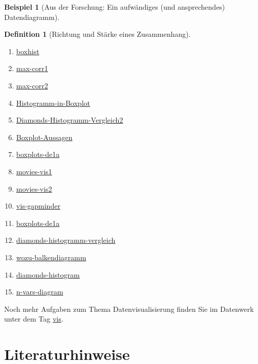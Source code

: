 \documentclass[
  a4paper,
]{scrbook}
\providecommand{\tightlist}{%
  \setlength{\itemsep}{0pt}\setlength{\parskip}{0pt}}\usepackage{longtable,booktabs,array}
\theoremstyle{definition}
\newtheorem{example}{Beispiel}[chapter]
\theoremstyle{definition}
\newtheorem{definition}{Definition}[chapter]
\theoremstyle{definition}
\theoremstyle{remark}
\begin{document}
\begin{example}[Aus der Forschung: Ein aufwändiges (und ansprechendes)
Datendiagramm]
\begin{definition}[Richtung und Stärke eines
Zusammenhang]
\begin{enumerate}
\def\labelenumi{\arabic{enumi}.}
\tightlist
\item
  \href{https://datenwerk.netlify.app/posts/boxhist/boxhist.html}{boxhist}
\item
  \href{https://datenwerk.netlify.app/posts/max-corr1/max-corr1.html}{max-corr1}
\item
  \href{https://datenwerk.netlify.app/posts/max-corr2/max-corr2.html}{max-corr2}
\item
  \href{https://datenwerk.netlify.app/posts/histogramm-in-boxplot/histogramm-in-boxplot}{Histogramm-in-Boxplot}
\item
  \href{https://datenwerk.netlify.app/posts/diamonds-histogramm-vergleich2/diamonds-histogramm-vergleich2}{Diamonds-Histogramm-Vergleich2}
\item
  \href{https://datenwerk.netlify.app/posts/boxplot-aussagen/boxplot-aussagen}{Boxplot-Aussagen}
\item
  \href{https://datenwerk.netlify.app/posts/boxplots-de1a/boxplots-de1a.html}{boxplots-de1a}
\item
  \href{https://datenwerk.netlify.app/posts/movies-vis1/movies-vis1.html}{movies-vis1}
\item
  \href{https://datenwerk.netlify.app/posts/movies-vis2/movies-vis2.html}{movies-vis2}
\item
  \href{https://datenwerk.netlify.app/posts/vis-gapminder/vis-gapminder}{vis-gapminder}
\item
  \href{https://datenwerk.netlify.app/posts/boxplots-de1a/boxplots-de1a}{boxplots-de1a}
\item
  \href{https://datenwerk.netlify.app/posts/diamonds-histogramm-vergleich/diamonds-histogramm-vergleich}{diamonds-histogramm-vergleich}
\item
  \href{https://datenwerk.netlify.app/posts/wozu-balkendiagramm/wozu-balkendiagramm}{wozu-balkendiagramm}
\item
  \href{https://datenwerk.netlify.app/posts/diamonds-histogram/diamonds-histogram}{diamonds-histogram}
\item
  \href{https://datenwerk.netlify.app/posts/n-vars-diagram/n-vars-diagram}{n-vars-diagram}
\end{enumerate}

Noch mehr Aufgaben zum Thema Datenvisualisierung finden Sie im Datenwerk
unter dem Tag \href{https://datenwerk.netlify.app/\#category=vis}{vis}.

\section{Literaturhinweise}\label{literaturhinweise-2}


\end{definition}
\end{example}
\end{document}
